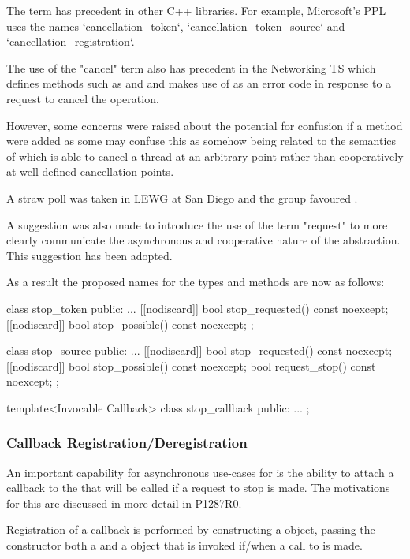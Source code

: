 The term  has precedent in other C++ libraries.
For example, Microsoft's PPL uses the names `cancellation_token`, `cancellation_token_source`
and `cancellation_registration`.

The use of the "cancel" term also has precedent in the Networking TS which defines methods
such as  and  and makes
use of  as an error code in response to a request to
cancel the operation.

However, some concerns were raised about the potential for confusion if a 
method were added as some may confuse this as somehow being related to the semantics of
 which is able to cancel a thread at an arbitrary point rather than
cooperatively at well-defined cancellation points.

A straw poll was taken in LEWG at San Diego and the group favoured .

A suggestion was also made to introduce the use of the term "request" to more clearly
communicate the asynchronous and cooperative nature of the abstraction. This suggestion
has been adopted.

As a result the proposed names for the types and methods are now as follows:
\begin{codeblock}
class stop_token {
public:
  ...
  [[nodiscard]] bool stop_requested() const noexcept;
  [[nodiscard]] bool stop_possible() const noexcept;
};

class stop_source {
public:
  ...
  [[nodiscard]] bool stop_requested() const noexcept;
  [[nodiscard]] bool stop_possible() const noexcept;
  bool request_stop() const noexcept;
};

template<Invocable Callback>
class stop_callback {
public:
  ...
};
\end{codeblock}

\subsubsection*{Callback Registration/Deregistration}

An important capability for asynchronous use-cases for  is the ability to attach
a callback to the  that will be called if a request to stop is made. The motivations
for this are discussed in more detail in P1287R0.

Registration of a callback is performed by constructing a  object,
passing the constructor both a  and a  object that
is invoked if/when a call to  is made.

